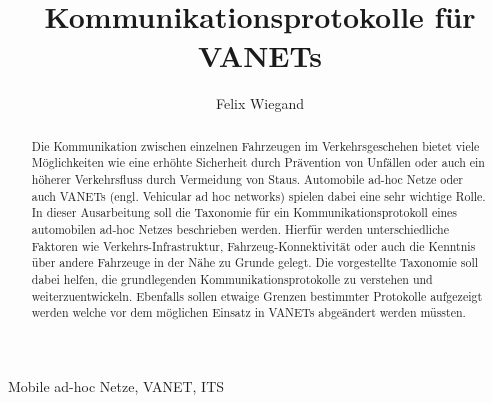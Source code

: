 \documentclass[english,runningheads,a4paper]{llncs}[2018/03/10]
\begin{document}
\title{Kommunikationsprotokolle für VANETs}

\author{Felix Wiegand}

%
%

\maketitle

\begin{abstract}
  Die Kommunikation zwischen einzelnen Fahrzeugen im Verkehrsgeschehen bietet viele Möglichkeiten wie eine erhöhte Sicherheit durch Prävention von Unfällen oder auch ein höherer Verkehrsfluss durch Vermeidung von Staus.
  Automobile ad-hoc Netze oder auch VANETs (engl. Vehicular ad hoc networks) spielen dabei eine sehr wichtige Rolle.
  In dieser Ausarbeitung soll die Taxonomie für ein Kommunikationsprotokoll eines automobilen ad-hoc Netzes beschrieben werden.
  Hierfür werden unterschiedliche Faktoren wie Verkehrs-Infrastruktur, Fahrzeug-Konnektivität oder auch die Kenntnis über andere Fahrzeuge in der Nähe zu Grunde gelegt.
  Die vorgestellte Taxonomie soll dabei helfen, die grundlegenden Kommunikationsprotokolle zu verstehen und weiterzuentwickeln.
  Ebenfalls sollen etwaige Grenzen bestimmter Protokolle aufgezeigt werden welche vor dem möglichen Einsatz in VANETs abgeändert werden müssten\cite{conti2013mobile}.
\end{abstract}

\begin{keywords}
  Mobile ad-hoc Netze, VANET, ITS
\end{keywords}
\end{document}
